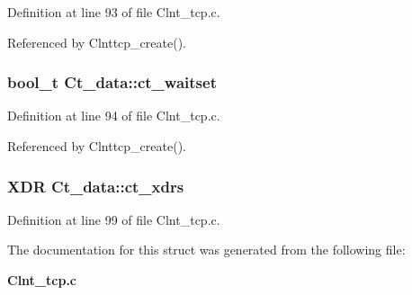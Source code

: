 Definition at line 93 of file Clnt\_\-tcp.c.

Referenced by Clnttcp\_\-create().
\subsubsection{\setlength{\rightskip}{0pt plus 5cm}bool\_\-t {\bf Ct\_\-data::ct\_\-waitset}}\label{structCt__data_o3}




Definition at line 94 of file Clnt\_\-tcp.c.

Referenced by Clnttcp\_\-create().
\subsubsection{\setlength{\rightskip}{0pt plus 5cm}XDR {\bf Ct\_\-data::ct\_\-xdrs}}\label{structCt__data_o8}




Definition at line 99 of file Clnt\_\-tcp.c.

The documentation for this struct was generated from the following file:\begin{CompactItemize}
\item 
{\bf Clnt\_\-tcp.c}\end{CompactItemize}
